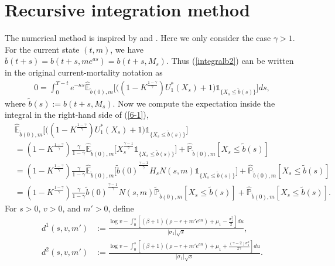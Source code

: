 \documentclass[a4paper,11pt]{amsart}
\numberwithin{equation}{section}
\newcommand{\blue}[1]{{\color{black}#1}}
\begin{document}
{\section{Recursive integration method}\label{numerical}
\renewcommand\theequation{B.\arabic{equation}}
\renewcommand\thesubsection{B.\arabic{subsection}}
The numerical method is inspired by \citet{huang1996pricing} and \citet{jeon2018portfolio}. Here we only consider the case $\gamma>1$. \blue{For the current state $(t,m)$, we have  $\overline b(t+s)=b(t+s,me^{as})=b(t+s,M_s)$. Thus (\ref{integralb2}) can be written in the original current-mortality notation as}
\begin{align}\label{6-1}
0= \int^{T-t}_0 e^{-\kappa s}\widehat{\mathbb{E}}_{\widetilde{b}(0),m}\Big[ \Big((1-K^{\frac{1-\gamma}{\gamma}}){U}^\ast_1(X_s) +1\Big) \mathds{1}_{\{X_s \leq \widetilde{b}(s)\}}\Big]ds,
\end{align}
where $\widetilde{b}(s):= b(t+s,M_s)$. Now we compute the expectation inside the integral in the right-hand side of (\ref{6-1}),
\begin{align*}
	&\widehat{\mathbb{E}}_{\widetilde{b}(0),m}\Big[ \Big((1-K^{\frac{1-\gamma}{\gamma}}){U}^\ast_1(X_s) +1\Big) \mathds{1}_{\{X_s \leq \widetilde{b}(s)\}}\Big]\\&= (1-K^{\frac{1-\gamma}{\gamma}})\frac{\gamma}{1-\gamma}\widehat{\mathbb{E}}_{\widetilde{b}(0),m}\Big[ X_s^{\frac{\gamma-1}{\gamma}}  \mathds{1}_{\{X_s \leq \widetilde{b}(s)\}}\Big]+ \widehat{\mathbb{P}}_{\widetilde{b}(0),m}[ X_s \leq \widetilde{b}(s)]\\
	&=(1-K^{\frac{1-\gamma}{\gamma}})\frac{\gamma}{1-\gamma}\widehat{\mathbb{E}}_{\widetilde{b}(0),m}\Big[ {\widetilde{b}(0)}^{\frac{\gamma-1}{\gamma}}H_sN(s,m)  \mathds{1}_{\{X_s \leq \widetilde{b}(s)\}}\Big]+ \widehat{\mathbb{P}}_{\widetilde{b}(0),m}[  X_s \leq \widetilde{b}(s)]\\	
	&=(1-K^{\frac{1-\gamma}{\gamma}})\frac{\gamma}{1-\gamma} {\widetilde{b}(0)}^{\frac{\gamma-1}{\gamma}}N(s,m)\widetilde{\mathbb{P}}_{\widetilde{b}(0),m}[ X_s \leq \widetilde{b}(s)]+ \widehat{\mathbb{P}}_{\widetilde{b}(0),m}[  X_s \leq \widetilde{b}(s)].	\end{align*}
\blue{For $s>0$, $v>0$, and $m'>0$, define
\begin{align*}
d^1(s,v,m')&:=\frac{\log v-\int^s_0[(\beta+1)(\rho-r+m'e^{au})+\mu_1-\frac{\sigma_1^2}{2}]du}{|\sigma_1|\sqrt{s}},\\
d^2(s,v,m')&:=\frac{\log v-\int^s_0[(\beta+1)(\rho-r+m'e^{au})+\mu_1+\frac{(\gamma-2)\sigma_1^2}{2\gamma}]du}{|\sigma_1|\sqrt{s}}.

\end{align*}}}
\end{document}
